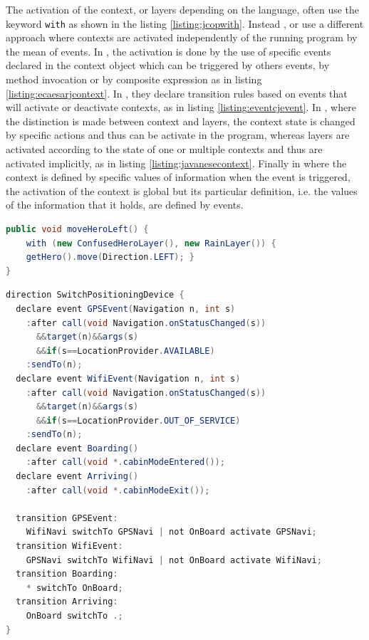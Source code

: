 \documentclass[a4paper]{article}
\begin{document}
The activation of the context, or layers depending on the language, often use the keyword \lstinline|with| \cite{haupt_contextj:_2011} \cite{appeltauer_declarative_2013} \cite{kamina_towards_2009} \cite{wasty_contextlua:_2010} as shown in the listing \ref{listing:jcopwith}. Instead \cite{ghezzi_context_2010}, \cite{nunez_declarative_2009} or \cite{kamina_eventcj:_2011} use a different approach where contexts are activated independently of the running program by the mean of events. In \cite{nunez_declarative_2009}, the activation is done by the use of specific events declared in the context object which can be triggered by others events, by method invocation or by composite expression as in listing \ref{listing:ecaesarjcontext}. In \cite{kamina_eventcj:_2011}, they declare transition rules based on events that will activate or deactivate contexts, as in listing \ref{listing:eventcjevent}. In \cite{kamina_unified_2013}, where the distinction is made between context and layers, the context state is changed by specific actions and thus can be activate in the program, whereas layers are activated according to the state of one or multiple contexts and thus are activated implicitly, as in listing \ref{listing:javanesecontext}. Finally in \cite{jayaram_context-oriented_2009} where the context is defined by specific values of information when the event is triggered, the activation of the context is global but its particular definition, i.e. the values of the information that it holds, are defined by events.

 
\begin{lstlisting}[float, language=Java, caption=JCop layer activation, label={listing:jcopwith}]
public void moveHeroLeft() {
	with (new ConfusedHeroLayer(), new RainLayer()) {
    getHero().move(Direction.LEFT); }
}
\end{lstlisting}

\begin{lstlisting}[float, language=Java, caption=EventCJ layer activation, label={listing:eventcjevent}]
direction SwitchPositioningDevice {
  declare event GPSEvent(Navigation n, int s)
    :after call(void Navigation.onStatusChanged(s))
      &&target(n)&&args(s)
      &&if(s==LocationProvider.AVAILABLE)
    :sendTo(n);
  declare event WifiEvent(Navigation n, int s)
    :after call(void Navigation.onStatusChanged(s))
      &&target(n)&&args(s)
      &&if(s==LocationProvider.OUT_OF_SERVICE)
    :sendTo(n);
  declare event Boarding()
    :after call(void *.cabinModeEntered());
  declare event Arriving()
    :after call(void *.cabinModeExit());
  
  transition GPSEvent:
    WifiNavi switchTo GPSNavi | not OnBoard activate GPSNavi;
  transition WifiEvent:
    GPSNavi switchTo WifiNavi | not OnBoard activate WifiNavi;
  transition Boarding:
    * switchTo OnBoard;
  transition Arriving:
    OnBoard switchTo .;
}
\end{lstlisting}
\end{document}
